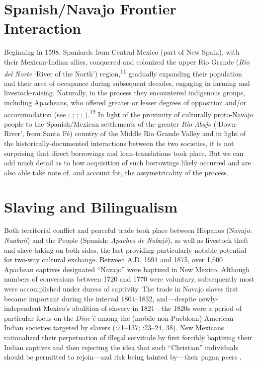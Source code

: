 \section{\textbf{Spanish/Navajo} \textbf{Frontier} \textbf{Interaction}}

Beginning in 1598, Spaniards from Central Mexico (part of New Spain), with their Mexican-Indian allies, conquered and colonized the upper Rio Grande (\textit{Río} \textit{del} \textit{Norte} ‘River of the North’) region,\textsuperscript{11} gradually expanding their population and their area of occupance during subsequent decades, engaging in farming and livestock-raising.  Naturally, in the process they encountered indigenous groups, including Apacheans, who offered greater or lesser degrees of opposition and/or accommodation (see \citealt{Forbes1960}; \citealt{Spicer1962}; \citealt{Kessell2002}; \citealt{Acrey1988}; \citealt{BeckHaase1969}).\textsuperscript{12}  In light of the proximity of culturally proto-Navajo people to the Spanish/Mexican settlements of the greater \textit{Río} \textit{Abajo} (‘Down-River’, from Santa Fé) country of the Middle Rio Grande Valley and in light of the historically-documented interactions between the two societies, it is not surprising that direct borrowings and loan-translations took place.  But we can add much detail as to how acquisition of such borrowings likely occurred and are also able take note of, and account for, the assymetricality of the process.  

\section{\textbf{Slaving} \textbf{and} \textbf{Bilingualism}}

Both territorial conflict and peaceful trade took place between Hispanos (Navajo: \textit{Naakaii}) and the People (Spanish: \textit{Apaches} \textit{de} \textit{Nabajó}), as well as livestock theft and slave-taking on both sides, the last providing particularly notable potential for two-way cultural exchange.  Between A.D. 1694 and 1875, over 1,600 Apachean captives designated “Navajo” were baptized in New Mexico.  Although numbers of conversions between 1720 and 1770 were voluntary, subsequently most were accomplished under duress of captivity.  The trade in Navajo slaves first became important during the interval 1804–1832, and—despite newly-independent Mexico’s abolition of slavery in 1821—the 1820s were a period of particular focus on the \textit{Dine’é} among the (mobile non-Puebloan) American Indian societies targeted by slavers (\citealt{Bailey1966}:71–137; \citealt{Brugge1985}:23–24, 38).  New Mexicans rationalized their perpetuation of illegal servitude by first forcibly baptizing their Indian captives and then rejecting the idea that such “Christian” individuals should be permitted to rejoin—and risk being tainted by—their pagan peers \citep[144]{Acrey1988}.

